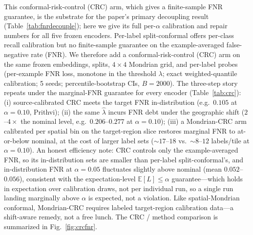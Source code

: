 \documentclass[journal]{IEEEtran}
\renewcommand{\_}{\textunderscore\allowbreak}
\begin{document}
This conformal-risk-control (CRC) arm, which gives a finite-sample FNR guarantee, is the substrate for the
paper's primary decoupling result (Table~\ref{tab:fnrdecouple}); here we give its full per-$\alpha$
calibration and repair numbers for all five frozen encoders. Per-label split-conformal offers per-class
recall calibration but no finite-sample guarantee on the example-averaged false-negative rate (FNR). We
therefore add a conformal-risk-control (CRC) arm \citep{angelopoulos2024crc} on the same frozen embeddings, splits,
$4\times4$ Mondrian grid, and per-label probes (per-example FNR loss, monotone in the threshold $\lambda$;
exact weighted-quantile calibration; 5 seeds; percentile-bootstrap CIs, $B{=}2000$). The three-step story
repeats under the marginal-FNR guarantee for every encoder (Table~\ref{tab:crc}): (i) source-calibrated CRC meets the
target FNR in-distribution (e.g.\ $0.105$ at $\alpha{=}0.10$, Prithvi); (ii) the same $\widehat{\lambda}$ incurs
FNR debt under the geographic shift ($2$--$4\times$ the nominal level, e.g.\ $0.206$--$0.277$ at
$\alpha{=}0.10$); (iii) a Mondrian-CRC arm calibrated per spatial bin on the target-region slice restores
marginal FNR to at-or-below nominal, at the cost of larger label sets (${\sim}17$--$18$ vs.\
${\sim}8$--$12$ labels/tile at $\alpha{=}0.10$). An honest efficiency note: CRC controls only the
example-averaged FNR, so its in-distribution sets are smaller than per-label split-conformal's, and
in-distribution FNR at $\alpha{=}0.05$ fluctuates slightly above nominal (mean $0.052$--$0.056$), consistent
with the expectation-level $\mathbb{E}[L]\le\alpha$ guarantee---which holds in expectation over calibration
draws, not per individual run, so a single run landing marginally above $\alpha$ is expected, not a violation. Like spatial-Mondrian conformal, Mondrian-CRC
requires labeled target-region calibration data---a shift-aware remedy, not a free lunch.
The CRC / method comparison is summarized in Fig.~\ref{fig:crcfnr}.
\end{document}
